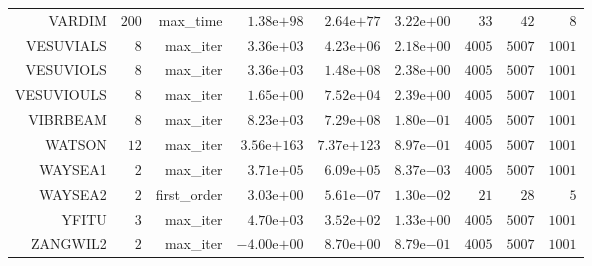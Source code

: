 \begin{longtable}{rrrrrrrrr}
VARDIM & \(   200\) & max\_time & \( 1.38\)e\(+98\) & \( 2.64\)e\(+77\) & \( 3.22\)e\(+00\) & \(    33\) & \(    42\) & \(     8\) \\
VESUVIALS & \(     8\) & max\_iter & \( 3.36\)e\(+03\) & \( 4.23\)e\(+06\) & \( 2.18\)e\(+00\) & \(  4005\) & \(  5007\) & \(  1001\) \\
VESUVIOLS & \(     8\) & max\_iter & \( 3.36\)e\(+03\) & \( 1.48\)e\(+08\) & \( 2.38\)e\(+00\) & \(  4005\) & \(  5007\) & \(  1001\) \\
VESUVIOULS & \(     8\) & max\_iter & \( 1.65\)e\(+00\) & \( 7.52\)e\(+04\) & \( 2.39\)e\(+00\) & \(  4005\) & \(  5007\) & \(  1001\) \\
VIBRBEAM & \(     8\) & max\_iter & \( 8.23\)e\(+03\) & \( 7.29\)e\(+08\) & \( 1.80\)e\(-01\) & \(  4005\) & \(  5007\) & \(  1001\) \\
WATSON & \(    12\) & max\_iter & \(3.56\)e\(+163\) & \(7.37\)e\(+123\) & \( 8.97\)e\(-01\) & \(  4005\) & \(  5007\) & \(  1001\) \\
WAYSEA1 & \(     2\) & max\_iter & \( 3.71\)e\(+05\) & \( 6.09\)e\(+05\) & \( 8.37\)e\(-03\) & \(  4005\) & \(  5007\) & \(  1001\) \\
WAYSEA2 & \(     2\) & first\_order & \( 3.03\)e\(+00\) & \( 5.61\)e\(-07\) & \( 1.30\)e\(-02\) & \(    21\) & \(    28\) & \(     5\) \\
YFITU & \(     3\) & max\_iter & \( 4.70\)e\(+03\) & \( 3.52\)e\(+02\) & \( 1.33\)e\(+00\) & \(  4005\) & \(  5007\) & \(  1001\) \\
ZANGWIL2 & \(     2\) & max\_iter & \(-4.00\)e\(+00\) & \( 8.70\)e\(+00\) & \( 8.79\)e\(-01\) & \(  4005\) & \(  5007\) & \(  1001\) \\\hline
\end{longtable}
